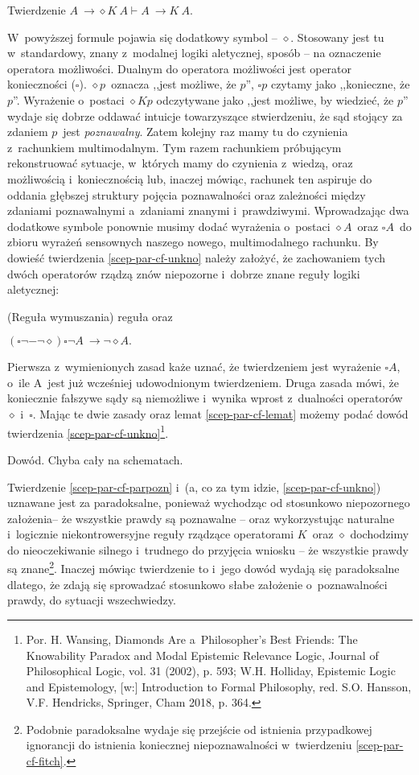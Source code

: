 {Twierdzenie $A~\to \diamond K~A \vdash A~\to K~A$.\label{scep-par-cf-unkno}

W~powyższej formule pojawia się dodatkowy symbol -- $\diamond$. Stosowany jest tu w~standardowy, znany z~modalnej logiki aletycznej, sposób -- na oznaczenie operatora możliwości. Dualnym do operatora możliwości jest operator konieczności ($\square$). $\diamond p$~oznacza ,,jest możliwe, że $p$'', $\square p$ czytamy jako ,,konieczne, że $p$''. Wyrażenie o~postaci $\diamond K p$ odczytywane jako ,,jest możliwe, by wiedzieć, że $p$'' wydaje się dobrze oddawać intuicje towarzyszące stwierdzeniu, że sąd stojący za zdaniem $p$~jest \textit{poznawalny}. Zatem kolejny raz mamy tu do czynienia z~rachunkiem multimodalnym. Tym razem rachunkiem próbującym rekonstruować sytuacje, w~których mamy do czynienia z~wiedzą, oraz możliwością i~koniecznością lub, inaczej mówiąc, rachunek ten aspiruje do oddania głębszej struktury pojęcia poznawalności oraz zależności między zdaniami poznawalnymi a~zdaniami znanymi i~prawdziwymi. Wprowadzając dwa dodatkowe symbole ponownie musimy dodać wyrażenia o~postaci $\diamond A$~oraz $\square A$~do zbioru wyrażeń sensownych naszego nowego, multimodalnego rachunku. By dowieść twierdzenia \ref{scep-par-cf-unkno} należy założyć, że zachowaniem tych dwóch operatorów rządzą znów niepozorne i~dobrze znane reguły logiki aletycznej:

(Reguła wymuszania) reguła oraz

$(\square \neg -\neg \diamond) \square \neg A~\to \neg \diamond A.$

Pierwsza z~wymienionych zasad każe uznać, że twierdzeniem jest wyrażenie $\square A$, o~ile A~jest już wcześniej udowodnionym twierdzeniem. Druga zasada mówi, że koniecznie fałszywe sądy są niemożliwe i~wynika wprost z~dualności operatorów $\diamond$ i~$\square$. Mając te dwie zasady oraz lemat \ref{scep-par-cf-lemat} możemy podać dowód twierdzenia \ref{scep-par-cf-unkno}\footnote{Por. H. Wansing, Diamonds Are a~Philosopher's Best Friends: The Knowability Paradox and Modal Epistemic Relevance Logic, Journal of Philosophical Logic, vol. 31 (2002), p. 593; W.H. Holliday, Epistemic Logic and Epistemology, [w:] Introduction to Formal Philosophy, red. S.O. Hansson, V.F. Hendricks, Springer, Cham 2018, p. 364.}.

Dowód. Chyba cały na schematach.

Twierdzenie \ref{scep-par-cf-parpozn} i~(a, co za tym idzie, \ref{scep-par-cf-unkno}) uznawane jest za paradoksalne, ponieważ wychodząc od stosunkowo niepozornego założenia– że wszystkie prawdy są poznawalne -- oraz wykorzystując naturalne i~logicznie niekontrowersyjne reguły rządzące operatorami $K$~oraz $\diamond$ dochodzimy do nieoczekiwanie silnego i~trudnego do przyjęcia wniosku -- że wszystkie prawdy są znane\footnote{Podobnie paradoksalne wydaje się przejście od istnienia przypadkowej ignorancji do istnienia koniecznej niepoznawalności w~twierdzeniu \ref{scep-par-cf-fitch}.}. Inaczej mówiąc twierdzenie to i~jego dowód wydają się paradoksalne dlatego, że zdają się sprowadzać stosunkowo słabe założenie o~poznawalności prawdy, do sytuacji wszechwiedzy.

}
